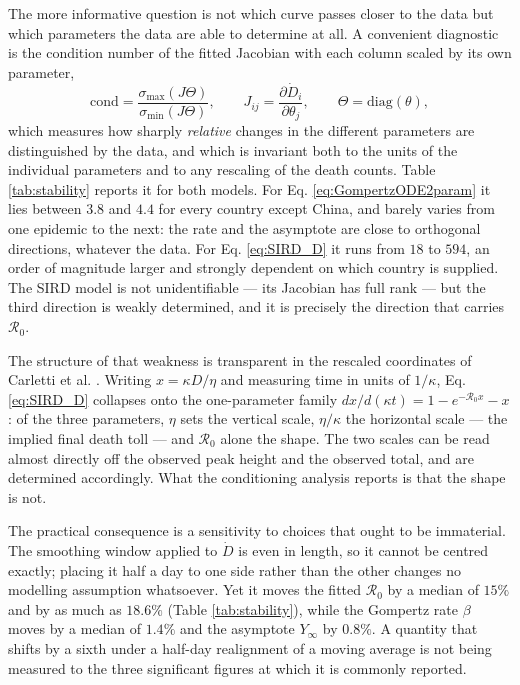 \documentclass{article}
\begin{document}
The more informative question is not which curve passes closer to the data but which
parameters the data are able to determine at all. A convenient diagnostic is the
condition number of the fitted Jacobian with each column scaled by its own parameter,
\begin{equation}
\label{eq:cond}
\mathrm{cond} = \frac{\sigma_{\max}(J\Theta)}{\sigma_{\min}(J\Theta)},
\qquad J_{ij} = \frac{\partial \dot{D}_i}{\partial\theta_j},
\qquad \Theta = \mathrm{diag}(\theta),
\end{equation}
which measures how sharply \emph{relative} changes in the different parameters are
distinguished by the data, and which is invariant both to the units of the individual
parameters and to any rescaling of the death counts. Table \ref{tab:stability} reports it
for both models. For Eq. \ref{eq:GompertzODE2param} it lies between $3.8$ and $4.4$ for
every country except China, and barely varies from one epidemic to the next: the rate and
the asymptote are close to orthogonal directions, whatever the data. For
Eq. \ref{eq:SIRD_D} it runs from $18$ to $594$, an order of magnitude larger and strongly
dependent on which country is supplied. The SIRD model is not unidentifiable --- its Jacobian has
full rank --- but the third direction is weakly determined, and it is precisely the direction that carries $\mathcal{R}_0$.

The structure of that weakness is transparent in the rescaled coordinates of Carletti
et al. \cite{carletti2020covid}. Writing $x=\kappa D/\eta$ and measuring time in units of
$1/\kappa$, Eq. \ref{eq:SIRD_D} collapses onto the one-parameter family
$dx/d(\kappa t) = 1 - e^{-\mathcal{R}_0 x} - x$: of the three parameters, $\eta$ sets the
vertical scale, $\eta/\kappa$ the horizontal scale --- the implied final death toll ---
and $\mathcal{R}_0$ alone the shape. The two scales can be read almost directly off the
observed peak height and the observed total, and are determined accordingly. What the
conditioning analysis reports is that the shape is not.

The practical consequence is a sensitivity to choices that ought to be immaterial. The
smoothing window applied to $\dot{D}$ is even in length, so it cannot be centred exactly;
placing it half a day to one side rather than the other changes no modelling assumption
whatsoever. Yet it moves the fitted $\mathcal{R}_0$ by a median of $15\%$ and by as much
as $18.6\%$ (Table \ref{tab:stability}), while the Gompertz rate $\beta$ moves by a
median of $1.4\%$ and the asymptote $Y_{\infty}$ by $0.8\%$. A quantity that shifts by a
sixth under a half-day realignment of a moving average is not being measured to the
three significant figures at which it is commonly reported.
\end{document}
